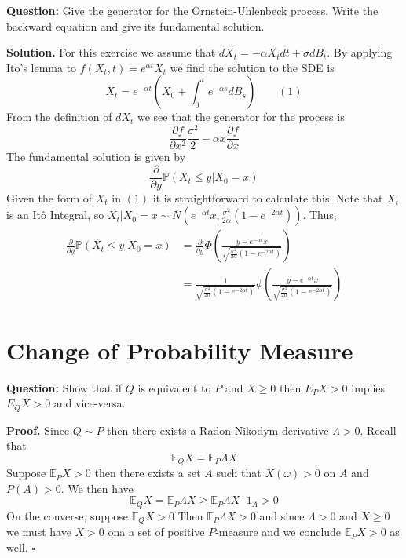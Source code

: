 \documentclass{article}
\begin{document}
\begin{tcolorbox}[colframe=black,colback=gray!5,boxrule=0.5pt]
\textbf{Question:} Give the generator for the Ornstein-Uhlenbeck process. Write the backward equation and give its fundamental solution.
\end{tcolorbox}
\textbf{Solution.} For this exercise we assume that $dX_t = -\alpha X_tdt + \sigma dB_t$. By applying Ito's lemma to $f(X_t,t)= e^{\alpha t}X_t$ we find the solution to the SDE is 
$$X_t = e^{-\alpha t}\left(X_0 + \int_0^te^{-\alpha s}dB_s\right)\quad\quad(1)$$
From the definition of $dX_t$ we see that the generator for the process is
$$\frac{\partial f}{\partial x^2}\frac{\sigma^2}{2} - \alpha x\frac{\partial f}{\partial x}$$
The fundamental solution is given by 
$$\frac{\partial}{\partial y}\mathbb{P}(X_t\leq y | X_0=x)$$
Given the form of $X_t$ in $(1)$ it is straightforward to calculate this. Note that $X_t$ is an Itô Integral, so $X_t | X_0=x\sim N(e^{-\alpha t}x, \frac{\sigma^2}{2\alpha}(1-e^{-2\alpha t}))$. Thus, 
\begin{align*}
    \frac{\partial}{\partial y}\mathbb{P}(X_t\leq y | X_0=x) &= \frac{\partial}{\partial y}\Phi\left(\frac{y-e^{-\alpha t}x}{\sqrt{\frac{\sigma^2}{2\alpha}(1-e^{-2\alpha t})}}\right) \\
    &= \frac{1}{\sqrt{\frac{\sigma^2}{2\alpha}(1-e^{-2\alpha t})}}\phi\left(\frac{y-e^{-\alpha t}x}{\sqrt{\frac{\sigma^2}{2\alpha}(1-e^{-2\alpha t})}}\right)
\end{align*}


\newpage
\section{Change of Probability Measure}

\begin{tcolorbox}[colframe=black,colback=gray!5,boxrule=0.5pt]
\textbf{Question:} Show that if $Q$ is equivalent to $P$ and $X\geq0$ then $E_PX > 0 $ implies $E_QX>0$ and vice-versa. 
\end{tcolorbox}
\textbf{Proof.} Since $Q\sim P$ then there exists a Radon-Nikodym derivative $\Lambda>0$. Recall that 
$$\mathbb{E}_QX = \mathbb{E}_P\Lambda X$$
Suppose $\mathbb{E}_PX >0$ then there exists a set $A$ such that $X(\omega)>0$ on $A$ and $P(A)>0$. We then have
$$\mathbb{E}_QX = \mathbb{E}_P\Lambda X \geq \mathbb{E}_P\Lambda X\cdot1_A>0$$
On the converse, suppose $\mathbb{E}_Q X> 0$ Then $\mathbb{E}_P\Lambda X>0$ and since $\Lambda > 0$ and $X\geq 0$ we must have $X>0$ ona a set of positive $P$-measure and we conclude $\mathbb{E}_PX>0$ as well. $\square$
\end{document}
